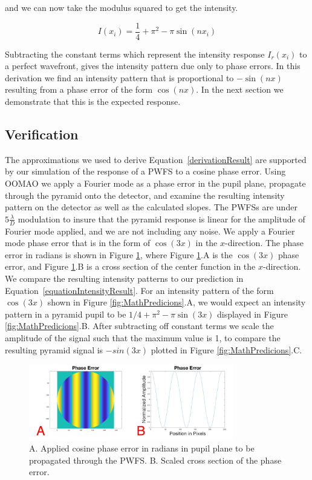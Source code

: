 and we can now take the modulus squared to get the intensity.

\begin{equation}
    I(x_i)=\frac{1}{4}+\pi^2-\pi \sin(nx_i)
    \label{equationIntensityResult}
\end{equation}

Subtracting the constant terms which represent the intensity response $I_r (x_i )$ to a perfect wavefront, gives the intensity pattern due only to phase errors. In this derivation we find an intensity pattern that is proportional to $-\sin(nx)$ resulting from a phase error of the form $\cos(nx)$. In the next section we demonstrate that this is the expected response.

\subsection{Verification}

The approximations we used to derive Equation~\ref{derivationResult} are supported by our simulation of the response of a PWFS to a cosine phase error. Using OOMAO we apply a Fourier mode as a phase error in the pupil plane, propagate through the pyramid onto the detector, and examine the resulting intensity pattern on the detector as well as the calculated slopes. The PWFSs are under $5 \frac{\lambda}{D}$ modulation to insure that the pyramid response is linear for the amplitude of Fourier mode applied, and we are not including any noise. We apply a Fourier mode phase error that is in the form of $\cos(3x)$ in the $x$-direction. The phase error in radians is shown in Figure \ref{fig:CosinePhaseDiagram}, where Figure \ref{fig:CosinePhaseDiagram}.A is the $\cos(3x)$ phase error, and Figure \ref{fig:CosinePhaseDiagram}.B is a cross section of the center function in the $x$-direction. We compare the resulting intensity patterns to our prediction in Equation~\ref{equationIntensityResult}. For an intensity pattern of the form $\cos(3x)$ shown in Figure \ref{fig:MathPredicions}.A, we would expect an intensity pattern in a pyramid pupil to be $1/4+\pi^2-\pi \sin(3x)$ displayed in Figure \ref{fig:MathPredicions}.B. After subtracting off constant terms we scale the amplitude of the signal such that the maximum value is 1, to compare the resulting pyramid signal is $-sin(3x)$ plotted in Figure \ref{fig:MathPredicions}.C.


\begin{figure}
    \centering
    \includegraphics[width=0.8\textwidth]{Chapter Materials/Chapter Two Materials/CosinePhaseDiagram.png}
    \caption{A. Applied cosine phase error in radians in pupil plane to be propagated through the PWFS. B. Scaled cross section of the phase error.}
    \label{fig:CosinePhaseDiagram}
\end{figure}

